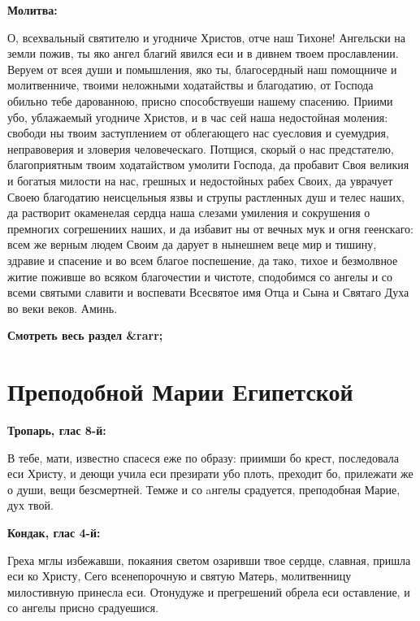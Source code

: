 \medskip


\bfseries Молитва:\normalfont{}


О, всехвальный святителю и угодниче Христов, отче наш Тихоне! Ангельски на земли пожив, ты яко ангел благий явился еси и в дивнем твоем прославлении. Веруем от всея души и помышления, яко ты, благосердный наш помощниче и молитвенниче, твоими неложными ходатайствы и благодатию, от Господа обильно тебе дарованною, присно способствуеши нашему спасению. Приими убо, ублажаемый угодниче Христов, и в час сей наша недостойная моления: свободи ны твоим заступлением от облегающего нас суесловия и суемудрия, неправоверия и зловерия человеческаго. Потщися, скорый о нас предстателю, благоприятным твоим ходатайством умолити Господа, да пробавит Своя великия и богатыя милости на нас, грешных и недостойных рабех Своих, да уврачует Своею благодатию неисцельныя язвы и струпы растленных душ и телес наших, да растворит окаменелая сердца наша слезами умиления и сокрушения о премногих согрешениих наших, и да избавит ны от вечных мук и огня геенскаго: всем же верным людем Своим да дарует в нынешнем веце мир и тишину, здравие и спасение и во всем благое поспешение, да тако, тихое и безмолвное житие поживше во всяком благочестии и чистоте, сподобимся со ангелы и со всеми святыми славити и воспевати Всесвятое имя Отца и Сына и Святаго Духа во веки веков. Аминь.


\mychapterending


\bfseries Смотреть весь раздел &rarr;\normalfont{} 

\section{Преподобной Марии Египетской}
 

\bfseries Тропарь, глас 8-й:\normalfont{}


В тебе, мати, известно спасеся еже по образу: приимши бо крест, последовала еси Христу, и деющи учила еси презирати убо плоть, преходит бо, прилежати же о души, вещи безсмертней. Темже и со aнгелы срадуется, преподобная Марие, дух твой.


\medskip


\bfseries Кондак, глас 4-й:\normalfont{}


Греха мглы избежавши, покаяния светом озаривши твое сердце, славная, пришла еси ко Христу, Сего всенепорочную и святую Матерь, молитвенницу милостивную принесла еси. Отонудуже и прегрешений обрела еси оставление, и со ангелы присно срадуешися.


